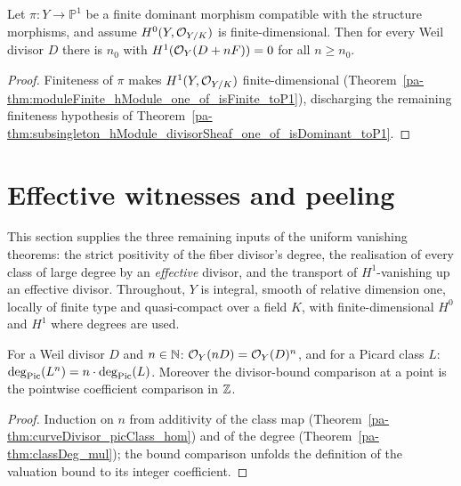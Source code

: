 \begin{theorem}
  \label{pa-thm:subsingleton_hModule_divisorSheaf_one_of_isFinite_toP1}
  \leanok

  Let \(\pi \colon Y \to \mathbb P^1\) be a finite dominant morphism compatible with the structure
  morphisms, and assume \(H^0(Y, \mathcal{O}_{Y/K})\) is finite-dimensional. Then for every Weil divisor
  \(D\) there is \(n_0\) with \(H^1(\mathcal{O}_{Y}(D + nF)) = 0\) for all \(n \ge n_0\).
\end{theorem}
\begin{proof}
  \leanok
  Finiteness of \(\pi\) makes \(H^1(Y, \mathcal{O}_{Y/K})\) finite-dimensional
  (Theorem~\ref{pa-thm:moduleFinite_hModule_one_of_isFinite_toP1}), discharging the remaining
  finiteness hypothesis of Theorem~\ref{pa-thm:subsingleton_hModule_divisorSheaf_one_of_isDominant_toP1}.
\end{proof}

\section{Effective witnesses and peeling}
\label{pa-sec:effective_peeling}

This section supplies the three remaining inputs of the uniform vanishing theorems: the
strict positivity of the fiber divisor's degree, the realisation of every class of large
degree by an \emph{effective} divisor, and the transport of \(H^1\)-vanishing up an
effective divisor. Throughout, \(Y\) is integral, smooth of relative dimension one, locally
of finite type and quasi-compact over a field \(K\), with finite-dimensional \(H^0\) and
\(H^1\) where degrees are used.

\begin{lemma}
  \label{pa-lem:picClass_nsmul}
  \leanok

  For a Weil divisor \(D\) and \(n \in \mathbb{N}\): \(\mathcal{O}_{Y}(n D) = \mathcal{O}_{Y}(D)^{n}\), and for
  a Picard class \(L\): \(\deg_{\operatorname{Pic}}(L^{n}) = n \cdot \deg_{\operatorname{Pic}}(L)\). Moreover the
  divisor-bound comparison at a point is the pointwise coefficient comparison in \(\mathbb{Z}\).
\end{lemma}
\begin{proof}
  \leanok
  Induction on \(n\) from additivity of the class map
  (Theorem~\ref{pa-thm:curveDivisor_picClass_hom}) and of the degree
  (Theorem~\ref{pa-thm:classDeg_mul}); the bound comparison unfolds the definition of the
  valuation bound to its integer coefficient.
\end{proof}

